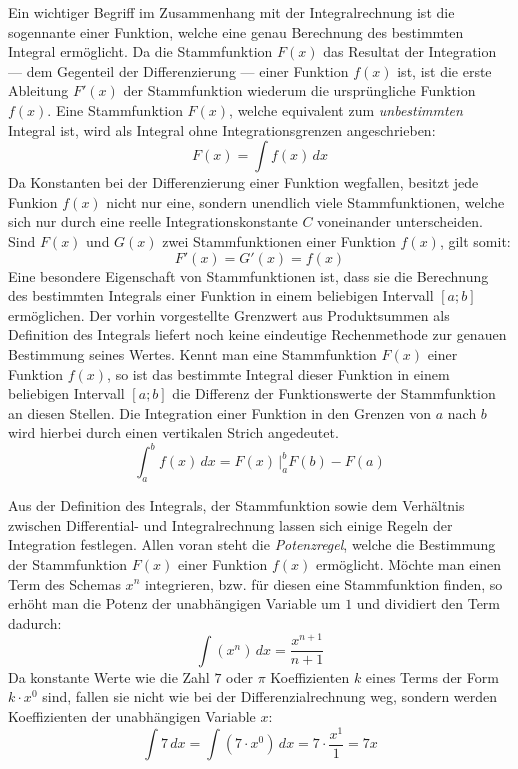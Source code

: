 Ein wichtiger Begriff im Zusammenhang mit der Integralrechnung ist die sogennante  einer Funktion, welche eine genau Berechnung des bestimmten Integral erm\"{o}glicht. Da die Stammfunktion $F(x)$ das Resultat der Integration --- dem Gegenteil der Differenzierung --- einer Funktion $f(x)$ ist, ist die erste Ableitung $F'(x)$ der Stammfunktion wiederum die urspr\"{u}ngliche Funktion $f(x)$. Eine Stammfunktion $F(x)$, welche equivalent zum \emph{unbestimmten} Integral ist, wird als Integral ohne Integrationsgrenzen angeschrieben: $$F(x) = \int f(x)\,dx$$ Da Konstanten bei der Differenzierung einer Funktion wegfallen, besitzt jede Funkion $f(x)$ nicht nur eine, sondern unendlich viele Stammfunktionen, welche sich nur durch eine reelle Integrationskonstante $C$ voneinander unterscheiden. Sind $F(x)$ und $G(x)$ zwei Stammfunktionen einer Funktion $f(x)$, gilt somit: $$F'(x) = G'(x) = f(x)$$ Eine besondere Eigenschaft von Stammfunktionen ist, dass sie die Berechnung des bestimmten Integrals einer Funktion in einem beliebigen Intervall $[a ; b]$ erm\"{o}glichen. Der vorhin vorgestellte Grenzwert aus Produktsummen als Definition des Integrals liefert noch keine eindeutige Rechenmethode zur genauen Bestimmung seines Wertes. Kennt man eine Stammfunktion $F(x)$ einer Funktion $f(x)$, so ist das bestimmte Integral dieser Funktion in einem beliebigen Intervall $[a ; b]$ die Differenz der Funktionswerte der Stammfunktion an diesen Stellen. Die Integration einer Funktion in den Grenzen von $a$ nach $b$ wird hierbei durch einen vertikalen Strich angedeutet. $$\int_a^b f(x) \, dx = F(x) \, \Big|_a^b F(b) - F(a)$$


Aus der Definition des Integrals, der Stammfunktion sowie dem Verh\"{a}ltnis zwischen Differential- und Integralrechnung lassen sich einige Regeln der Integration festlegen. Allen voran steht die \emph{Potenzregel}, welche die Bestimmung der Stammfunktion $F(x)$ einer Funktion $f(x)$ erm\"{o}glicht. M\"{o}chte man einen Term des Schemas $x^n$ integrieren, bzw. f\"{u}r diesen eine Stammfunktion finden, so erh\"{o}ht man die Potenz der unabh\"{a}ngigen Variable um $1$ und dividiert den Term dadurch: $$\int (x^n) \, dx = \frac{x^{n + 1}}{n + 1}$$ Da konstante Werte wie die Zahl $7$ oder $\pi$ Koeffizienten $k$ eines Terms der Form $k \cdot x^0$ sind, fallen sie nicht wie bei der Differenzialrechnung weg, sondern werden Koeffizienten der unabh\"{a}ngigen Variable $x$: $$\int 7 \, dx = \int (7 \cdot x^0) \, dx = 7 \cdot \frac{x^1}{1} = 7x$$ 

